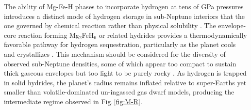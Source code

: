 \documentclass[draft,jgrga,12pt]{agujournal2019}
\begin{document}



The ability of Mg-Fe-H phases to incorporate hydrogen at tens of GPa pressures introduces a distinct mode of hydrogen storage in sub-Neptune interiors that the one governed by chemical reaction rather than physical solubility \cite{kim_stability_2023, werlen_subneptunes_2025}. 
The envelope-core reaction forming Mg$_2$FeH$_6$ or related hydrides provides a thermodynamically favorable pathway for hydrogen sequestration, particularly as the planet cools and crystallizes \cite{kim_stability_2023, horn_reaction_2023}. 
This mechanism should be considered for the diversity of observed sub-Neptune densities, some of which appear too compact to sustain thick gaseous envelopes but too light to be purely rocky \cite{kite_atmosphere_2020, bean_nature_2021}. 
As hydrogen is trapped in solid hydrides, the planet's radius remains inflated relative to super-Earths yet smaller than volatile-dominated un-ingassed gas dwarf models, producing the intermediate regime observed in Fig.\,\ref{fig:M-R}.

\end{document}
